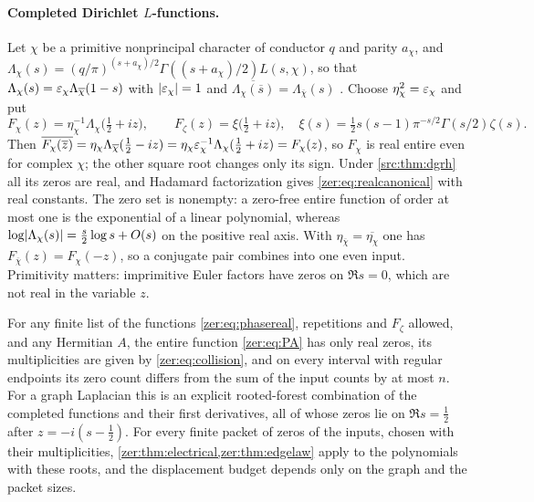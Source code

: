 \paragraph{Completed Dirichlet $L$-functions.}
Let $\chi$ be a primitive nonprincipal character of conductor $q$ and parity $a_\chi$, and
$\Lambda_\chi(s)=(q/\pi)^{(s+a_\chi)/2}\Gamma((s+a_\chi)/2)L(s,\chi)$, so that
$\Lambda_\chi(s)=\varepsilon_\chi\Lambda_{\overline\chi}(1-s)$ with $\lvert\varepsilon_\chi\rvert=1$ and
$\overline{\Lambda_\chi(\overline s)}=\Lambda_{\overline\chi}(s)$ \cite{NISTDLMFDirichlet}. Choose
$\eta_\chi^2=\varepsilon_\chi$ and put
\begin{equation}\label{zer:eq:phasereal}
 F_\chi(z)=\eta_\chi^{-1}\Lambda_\chi\bigl(\tfrac12+iz\bigr),\qquad
 F_\zeta(z)=\xi\bigl(\tfrac12+iz\bigr),\quad\xi(s)=\tfrac12s(s-1)\pi^{-s/2}\Gamma(s/2)\zeta(s).
\end{equation}
Then $\overline{F_\chi(\overline z)}=\eta_\chi\Lambda_{\overline\chi}(\tfrac12-iz)=\eta_\chi\varepsilon_\chi^{-1}\Lambda_\chi(\tfrac12+iz)=F_\chi(z)$,
so $F_\chi$ is real entire even for complex $\chi$; the other square root changes only its sign. Under
\cref{src:thm:dgrh} all its zeros are real, and Hadamard factorization gives
\eqref{zer:eq:realcanonical} with real constants. The zero set is nonempty: a zero-free entire function
of order at most one is the exponential of a linear polynomial, whereas
$\log\lvert\Lambda_\chi(s)\rvert=\tfrac s2\log s+O(s)$ on the positive real axis. With
$\eta_{\overline\chi}=\overline{\eta_\chi}$ one has $F_{\overline\chi}(z)=F_\chi(-z)$, so a conjugate
pair combines into one even input. Primitivity matters: imprimitive Euler factors have zeros on
$\Re s=0$, which are not real in the variable $z$.

\begin{corollary}\label{zer:cor:graphdirichlet}
For any finite list of the functions \eqref{zer:eq:phasereal}, repetitions and $F_\zeta$ allowed, and any
Hermitian $A$, the entire function \eqref{zer:eq:PA} has only real zeros, its multiplicities are given
by \eqref{zer:eq:collision}, and on every interval with regular endpoints its zero count differs from
the sum of the input counts by at most $n$. For a graph Laplacian this is an explicit rooted-forest
combination of the completed functions and their first derivatives, all of whose zeros lie on
$\Re s=\tfrac12$ after $z=-i(s-\tfrac12)$. For every finite packet of zeros of the inputs, chosen with
their multiplicities, \cref{zer:thm:electrical,zer:thm:edgelaw} apply to the polynomials with these
roots, and the displacement budget depends only on the graph and the packet sizes.
\end{corollary}


